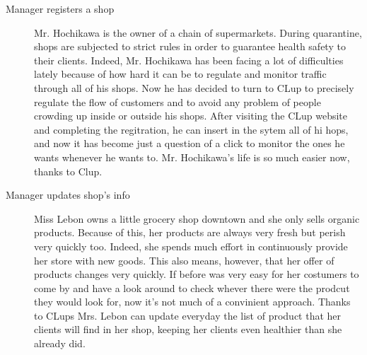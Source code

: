 \begin{description}
    \item[Manager registers a shop]
    Mr. Hochikawa is the owner of a chain of supermarkets.
    During quarantine, shops are subjected to strict rules in order to guarantee health safety to their clients. Indeed, Mr. Hochikawa has been facing a lot of difficulties lately because of how hard it can be to regulate and monitor traffic through all of his shops. Now he has decided to turn to CLup to precisely regulate the flow of customers and to avoid any problem of people crowding up inside or outside his shops. After visiting the CLup website and completing the regitration, he can insert in the sytem all of hi hops, and now it has become just a question of a click to monitor the ones he wants whenever he wants to. Mr. Hochikawa’s life is so much easier now, thanks to Clup.

    \item[Manager updates shop's info]
    Miss Lebon owns a little grocery shop downtown and she only sells organic products. Because of this, her products are always very fresh but perish very quickly too. Indeed, she spends much effort in continuously provide her store with new goods. This also means, however, that her offer of products changes very quickly. If before was very easy for her costumers to come by and have a look around to check whever there were the prodcut they would look for, now it's not much of a convinient approach. %
    Thanks to CLups Mrs. Lebon can update everyday the list of product that her clients will find in her shop, keeping her clients even healthier than she already did.
\end{description}


